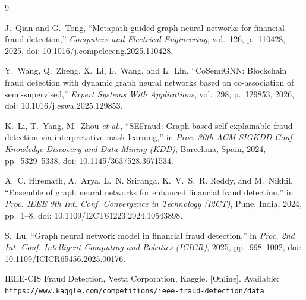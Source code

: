 \documentclass[conference]{IEEEtran}
\begin{document}
\begin{thebibliography}{9}

J.~Qian and G.~Tong, ``Metapath-guided graph neural networks for financial
fraud detection,'' \textit{Computers and Electrical Engineering}, vol.~126,
p.~110428, 2025, doi: 10.1016/j.compeleceng.2025.110428.

Y.~Wang, Q.~Zheng, X.~Li, L.~Wang, and L.~Lin, ``CoSemiGNN: Blockchain
fraud detection with dynamic graph neural networks based on co-association
of semi-supervised,'' \textit{Expert Systems With Applications}, vol.~298,
p.~129853, 2026, doi: 10.1016/j.eswa.2025.129853.

K.~Li, T.~Yang, M.~Zhou \textit{et al.}, ``SEFraud: Graph-based
self-explainable fraud detection via interpretative mask learning,'' in
\textit{Proc. 30th ACM SIGKDD Conf. Knowledge Discovery and Data Mining
(KDD)}, Barcelona, Spain, 2024, pp.~5329--5338, doi:
10.1145/3637528.3671534.

A.~C. Hiremath, A.~Arya, L.~N. Sriranga, K.~V.~S.~R. Reddy, and M.~Nikhil,
``Ensemble of graph neural networks for enhanced financial fraud
detection,'' in \textit{Proc. IEEE 9th Int. Conf. Convergence in Technology
(I2CT)}, Pune, India, 2024, pp.~1--8, doi: 10.1109/I2CT61223.2024.10543898.

S.~Lu, ``Graph neural network model in financial fraud detection,'' in
\textit{Proc. 2nd Int. Conf. Intelligent Computing and Robotics (ICICR)},
2025, pp.~998--1002, doi: 10.1109/ICICR65456.2025.00176.

IEEE-CIS Fraud Detection, Vesta Corporation, Kaggle. [Online]. Available:
\texttt{https://www.kaggle.com/competitions/ieee-fraud-detection/data}

\end{thebibliography}
\end{document}
